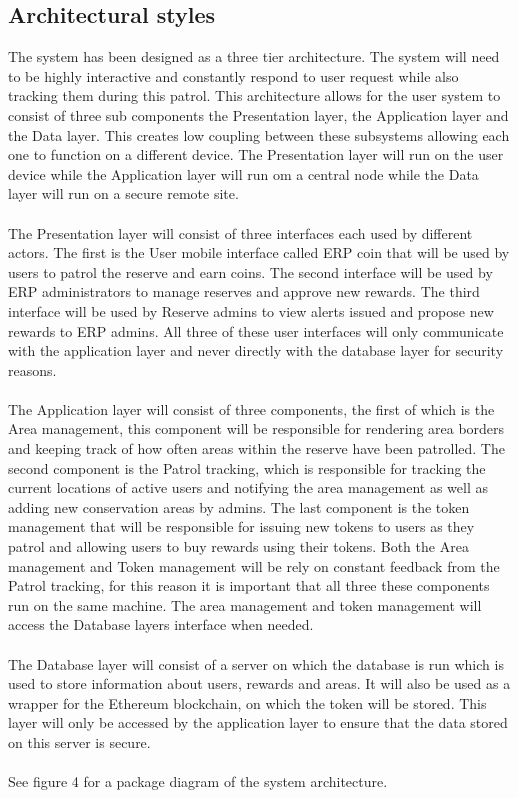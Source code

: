 \documentclass{article}
\begin{document}
\subsection{Architectural styles}
The system has been designed as a three tier architecture. The system will need to be highly interactive and constantly respond to user request while also tracking them during this patrol. This architecture allows for the user system to consist of three sub components the Presentation layer, the Application layer and the Data layer. This creates low coupling between these subsystems allowing each one to function on a different device. The Presentation layer will run on the user device while the Application layer will run om a central node while the Data layer will run on a secure remote site.\\\\The Presentation layer will consist of three interfaces each used by different actors. The first is the User mobile interface called ERP coin that will be used by users to patrol the reserve and earn coins. The second interface will be used by ERP administrators to manage reserves and approve new rewards. The third interface will be used by Reserve admins to view alerts issued and propose new rewards to ERP admins. All three of these user interfaces will only communicate with the application layer and never directly with the database layer for security reasons.\\\\The Application layer will consist of three components, the first of which is the Area management, this component will be responsible for rendering area borders and keeping track of how often areas within the reserve have been patrolled. The second component is the Patrol tracking, which is responsible for tracking the current locations of active users and notifying the area management as well as adding new conservation areas by admins. The last component is the token management that will be responsible for issuing new tokens to users as they patrol and allowing users to buy rewards using their tokens. Both the Area management and Token management will be rely on constant feedback from the Patrol tracking, for this reason it is important that all three these components run on the same machine. The area management and token management will access the Database layers interface when needed.\\\\The Database layer will consist of a server on which the database is run which is used to store information about users, rewards and areas. It will also be used as a wrapper for the Ethereum blockchain, on which the token will be stored. This layer will only be accessed by the application layer to ensure that the data stored on this server is secure.\\\\See figure 4 for a package diagram of the system architecture.
\end{document}
